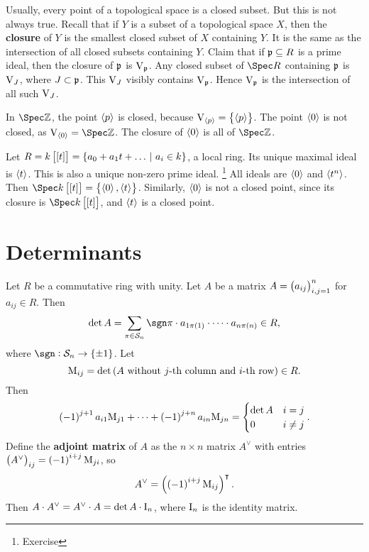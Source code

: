 Usually, every point of a topological space is a closed subset. But this is not always true. Recall that if $ Y $ is a subset of a topological space $ X $, then the \textbf{closure} of $ Y $ is the smallest closed subset of $ X $ containing $ Y $. It is the same as the intersection of all closed subsets containing $ Y $. Claim that if $ \mathfrak{p} \subseteq R $ is a prime ideal, then the closure of $ \mathfrak{p} $ is $ \mathrm{V}_{\mathfrak{p}} $. Any closed subset of $ \Spec R $ containing $ \mathfrak{p} $ is $ \mathrm{V}_J $, where $ J \subset \mathfrak{p} $. This $ \mathrm{V}_J $ visibly contains $ \mathrm{V}_{\mathfrak{p}} $. Hence $ \mathrm{V}_{\mathfrak{p}} $ is the intersection of all such $ \mathrm{V}_J $.

\begin{example*}
In $ \Spec \ZZ $, the point $ \left\langle p \right\rangle $ is closed, because $ \V_{\abr{p}} = \cbr{\abr{p}} $. The point $ \left\langle 0 \right\rangle $ is not closed, as $ \V_{\abr{0}} = \Spec \ZZ $. The closure of $ \left\langle 0 \right\rangle $ is all of $ \Spec \ZZ $.
\end{example*}

\begin{example*}
Let $ R = k\sbr{\sbr{t}} = \cbr{a_0 + a_1t + \dots \st a_i \in k} $, a local ring. Its unique maximal ideal is $ \left\langle t \right\rangle $. This is also a unique non-zero prime ideal. \footnote{Exercise} All ideals are $ \left\langle 0 \right\rangle $ and $ \left\langle t^n \right\rangle $. Then $ \Spec k\sbr{\sbr{t}} = \cbr{\abr{0}, \abr{t}} $. Similarly, $ \left\langle 0 \right\rangle $ is not a closed point, since its closure is $ \Spec k\sbr{\sbr{t}} $, and $ \left\langle t \right\rangle $ is a closed point.
\end{example*}

\pagebreak

\section{Determinants}


Let $ R $ be a commutative ring with unity. Let $ A $ be a matrix $ A = \br{a_{ij}}_{i, j = 1}^n $ for $ a_{ij} \in R $. Then
$$ \det A = \sum_{\pi \in \SSS_n} \sgn \pi \cdot a_{1\pi\br{1}} \cdot \dots \cdot a_{n\pi\br{n}} \in R, $$
where $ \sgn : \SSS_n \to \cbr{\pm 1} $. Let
$$ \M_{ij} = \det\br{A \ \text{without $ j $-th column and $ i $-th row}} \in R. $$
Then
$$ \br{-1}^{j + 1}a_{i1}\M_{j1} + \dots + \br{-1}^{j + n}a_{in}\M_{jn} =
\begin{cases}
\det A & i = j \\
0 & i \ne j
\end{cases}.
$$
Define the \textbf{adjoint matrix} of $ A $ as the $ n \times n $ matrix $ A^\vee $ with entries $ \br{A^\vee}_{ij} = \br{-1}^{i + j}\M_{ji} $, so
$$ A^\vee = \br{\br{-1}^{i + j}\M_{ij}}^\intercal. $$
Then $ A \cdot A^\vee = A^\vee \cdot A = \det A \cdot \mathrm{I}_n $, where $ \mathrm{I}_n $ is the identity matrix.

